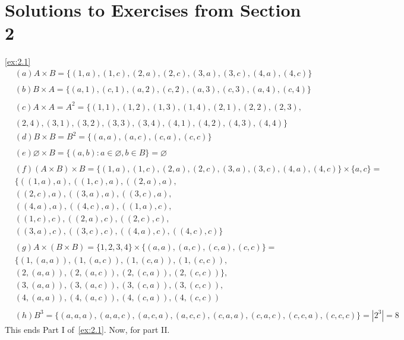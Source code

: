 
\section*{Solutions to Exercises from Section 2}
\begin{solution}\label{sol:2.1}\ref{ex:2.1}
$$
\begin{aligned}
    &(a) A\times B =\{ (1,a),(1,c),(2,a),(2,c),(3,a),(3,c),(4,a),(4,c) \}\\\\
    &(b) B\times A =\{ (a,1),(c,1),(a,2),(c,2),(a,3),(c,3),(a,4),(c,4) \}\\\\
    &(c) A\times A =A^2= \{ (1,1),(1,2),(1,3),(1,4),(2,1),(2,2),(2,3),\\\\
    &(2,4),(3,1),(3,2),(3,3),(3,4),(4,1),(4,2),(4,3),(4,4) \}\\
    &(d) B\times B = B^2 = \{ (a,a),(a,c), (c,a),(c,c) \}\\\\
    &(e) \varnothing\times B= \{ (a,b):a\in\varnothing,b\in B \}= \varnothing\\\\
    &(f) (A\times B)\times B = \{ (1,a),(1,c),(2,a),(2,c),(3,a),(3,c),(4,a),(4,c) \}\times
    \{ a,c \}=\\
    &\{ ((1,a),a),((1,c),a), ((2,a),a),\\
    &((2,c),a), ((3,a),a),((3,c),a),\\
    &((4,a),a),((4,c),a), ((1,a),c),\\ 
    &((1,c),c),((2,a),c),((2,c),c),\\
    &((3,a),c),((3,c),c),((4,a),c),((4,c),c) \}\\\\
    &(g) A\times (B\times B) = \{ 1,2,3,4 \}\times \{ (a,a),(a,c),(c,a),(c,c) \}=\\
    &\{ (1,(a,a)),(1,(a,c)),(1,(c,a)),(1,(c,c)),\\
    &(2,(a,a)),(2,(a,c)),(2,(c,a)),(2,(c,c))\},\\
    &(3,(a,a)), (3,(a,c)), (3,(c,a)),(3,(c,c)),\\
    &(4,(a,a)),(4,(a,c)),(4,(c,a)),(4,(c,c))\\\\
    &(h) B^3=\{ (a,a,a),(a,a,c),(a,c,a), (a,c,c), (c,a,a),(c,a,c),(c,c,a),(c,c,c) \} = |2^3| = 8
\end{aligned}
$$
This ends Part I of~\ref{ex:2.1}. Now, for part II.\@
$$
\begin{aligned}

\end{aligned}$$
\end{solution}
